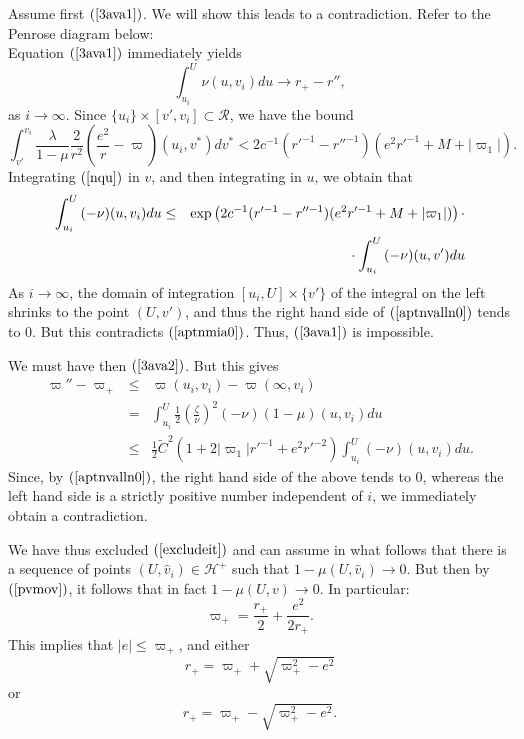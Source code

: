 \documentclass{article}
\newcommand{\zn}{\frac{\zeta}{\nu}}
\begin{document}
Assume first $(\ref{3ava1})$. We will show this leads to a contradiction.
Refer to the Penrose diagram below:
\[

\]
Equation $(\ref{3ava1})$ immediately yields
\begin{equation}
\label{aptnmia0}
\int_{u_i}^U{\nu(u,v_i)du}\to r_+-r'',
\end{equation}
as $i\to\infty$.
Since $\{u_i\}\times[v',v_i]\subset\mathcal{R}$,
we have the bound
\[
\int_{v'}^{v_i}{\frac{\lambda}{1-\mu}\frac{2}{r^2}
\left(\frac{e^2}r-\varpi\right)(u_i,v^*)dv^*}<
2c^{-1}(r'^{-1}-r''^{-1})(e^2r'^{-1}+M+|\varpi_1|).
\]
Integrating $(\ref{nqu})$ in $v$, and then integrating in $u$,
we obtain that
\begin{eqnarray}
\label{aptnvalln0}
\nonumber
\int_{u_i}^U{(-\nu)(u,v_i) du}&\le& 
\exp\left(2c^{-1}(r'^{-1}-r''^{-1})(e^2r'^{-1}+M+|\varpi_1|)\right)\cdot\\
&&\hbox{}\cdot\int_{u_i}^U{(-\nu)(u,v') du}
\end{eqnarray}
As $i\to\infty$, the domain of integration $[u_i,U]\times \{v'\}$ of the integral
on the left shrinks to the point
$(U,v')$, and thus the right hand side of $(\ref{aptnvalln0})$ tends to $0$.
But
this contradicts $(\ref{aptnmia0})$. Thus, $(\ref{3ava1})$ is impossible.

We must have then $(\ref{3ava2})$.
But this gives
\begin{eqnarray*}
\varpi''-\varpi_+			&\le&	\varpi(u_i,v_i)-\varpi(\infty,v_i)\\
					&=&	\int_{u_i}^ U
							\frac12\left(\zn\right)^2
							(-\nu)(1-\mu)(u,v_i)du\\
					&\le&	\frac12\tilde{C}^2(1+2|\varpi_1|
							r'^{-1}+e^2r'^{-2})
							\int_{u_i}^U{(-\nu)(u,v_i)du}.
\end{eqnarray*}
Since, by $(\ref{aptnvalln0})$, the right hand side of the above tends to $0$, whereas
the left hand side is a strictly positive number independent of $i$, we immediately
obtain a contradiction.

We have thus excluded $(\ref{excludeit})$ and can assume
in what follows that
there is a sequence
of points $(U,\hat{v}_i)\in\mathcal{H}^+$ 
such that $1-\mu(U,\hat{v}_i)\to0$. But then 
by $(\ref{pvmov})$, it follows that in fact $1-\mu(U,v)\to0$.
In particular:
\[
\varpi_+=\frac{r_+}2+\frac{e^2}{2r_+}.
\]
This implies that $|e|\le\varpi_+$, and either
\begin{equation}
\label{duvato}
r_+=\varpi_++\sqrt{\varpi_+^2-e^2}
\end{equation}
or 
\begin{equation}
\label{aduvato}
r_+=\varpi_+-\sqrt{\varpi_+^2-e^2}.
\end{equation}
\end{document}
